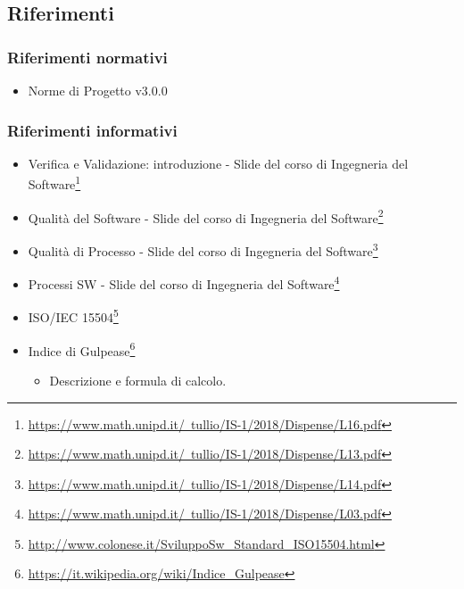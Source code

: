 \subsection{Riferimenti}
\label{sec:ref}
\subsubsection{Riferimenti normativi}
\begin{itemize}
	\item Norme di Progetto v3.0.0
\end{itemize}
\subsubsection{Riferimenti informativi}
\begin{itemize}
	\item
		Verifica e Validazione: introduzione - Slide del corso di Ingegneria del Software\footnote{\href{https://www.math.unipd.it/~tullio/IS-1/2018/Dispense/L16.pdf}{https://www.math.unipd.it/~tullio/IS-1/2018/Dispense/L16.pdf}}
	\item
		Qualità del Software - Slide del corso di Ingegneria del Software\footnote{\href{https://www.math.unipd.it/~tullio/IS-1/2018/Dispense/L13.pdf}{https://www.math.unipd.it/~tullio/IS-1/2018/Dispense/L13.pdf}}	
	\item
		Qualità di Processo - Slide del corso di Ingegneria del Software\footnote{\href{https://www.math.unipd.it/~tullio/IS-1/2018/Dispense/L14.pdf}{https://www.math.unipd.it/~tullio/IS-1/2018/Dispense/L14.pdf}}
	\item
		Processi SW - Slide del corso di Ingegneria del Software\footnote{\href{https://www.math.unipd.it/~tullio/IS-1/2018/Dispense/L03.pdf}{https://www.math.unipd.it/~tullio/IS-1/2018/Dispense/L03.pdf}}
	\item 
		ISO/IEC 15504\footnote{\href{http://www.colonese.it/SviluppoSw_Standard_ISO15504.html}{http://www.colonese.it/SviluppoSw\_{}Standard\_{}ISO15504.html}}
	\item 
		Indice di Gulpease\footnote{\href{https://it.wikipedia.org/wiki/Indice_Gulpease}{https://it.wikipedia.org/wiki/Indice\_{}Gulpease}}
		\begin{itemize}
			\item Descrizione e formula di calcolo.
		\end{itemize}
\end{itemize}
